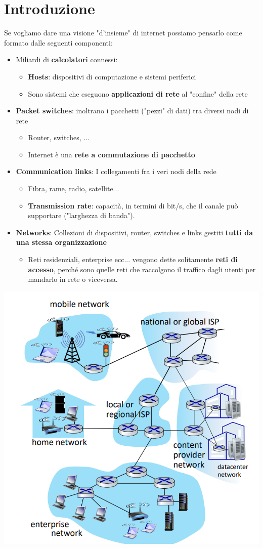 \documentclass[12pt]{article}
\begin{document}
\section{Introduzione}
Se vogliamo dare una visione "d'insieme" di internet possiamo pensarlo come formato dalle
seguenti componenti:
\begin{itemize}
    \item Miliardi di \textbf{calcolatori} connessi:
    \begin{itemize}
        \item \textbf{Hosts}: dispositivi di computazione e sistemi periferici
        \item Sono sistemi che eseguono \textbf{applicazioni di rete} al "confine" della rete
    \end{itemize}
    \item \textbf{Packet switches}: inoltrano i pacchetti ("pezzi" di dati) tra diversi nodi di rete
    \begin{itemize}
        \item Router, switches, ...
        \item Internet è una \textbf{rete a commutazione di pacchetto}
    \end{itemize}
    \item \textbf{Communication links}: I collegamenti fra i veri nodi della rede
    \begin{itemize}
        \item Fibra, rame, radio, satellite...
        \item \textbf{Transmission rate}: capacità, in termini di bit/s, che il canale può supportare ("larghezza di banda").
    \end{itemize} 
    \item \textbf{Networks}: Collezioni di dispositivi, router, switches e links gestiti \textbf{tutti da una stessa organizzazione}
    \begin{itemize}
        \item Reti residenziali, enterprise ecc... vengono dette solitamente \textbf{reti di accesso}, perché sono quelle reti che raccolgono il traffico
        dagli utenti per mandarlo in rete o viceversa.
    \end{itemize}
\end{itemize}
\begin{center}
    \includegraphics[width = 0.70\linewidth]{Images/1.PNG}
\end{center}
\end{document}
